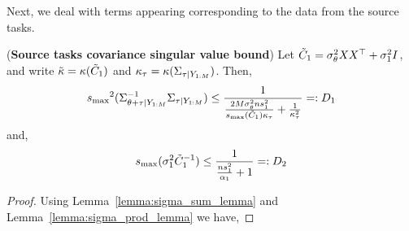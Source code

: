Next, we deal with terms appearing corresponding to the data from the source tasks.

\begin{lemma}(\textbf{Source tasks covariance singular value bound})\label{lemma:source_tasks_cov_bound}
Let $\tilde{C}_{1} = \sigma_\theta^2 X_{} X_{}^\top + \sigma_1^2 I$, and write $\tilde{\kappa} = \kappa(\tilde{C}_{1})$ and $\kappa_\tau = \kappa(\Sigma_{\tau \vert Y_{1:M}})$. Then,
\[{s_{\max}}^2(\Sigma_{\theta + \tau \vert Y_{1:M}}^{-1} \Sigma_{\tau \vert Y_{1:M}})
\le \frac{1}{\frac{2M{\sigma_\theta^2}{n} s_1^2}{{s_{\max}}(\tilde{C}_{1}) \kappa_\tau} + \frac{1}{\kappa_\tau^2}} =: D_1 \]
and,
\[{s_{\max}}(\sigma_1^2 \tilde{C}_{1}^{-1}) \le \frac{1}{ \frac{{n}s_1^2}{\alpha_1} + 1} =: D_2 \]
\end{lemma}

\begin{proof}
Using Lemma~\ref{lemma:sigma_sum_lemma} and Lemma~\ref{lemma:sigma_prod_lemma} we have,


\end{proof}

